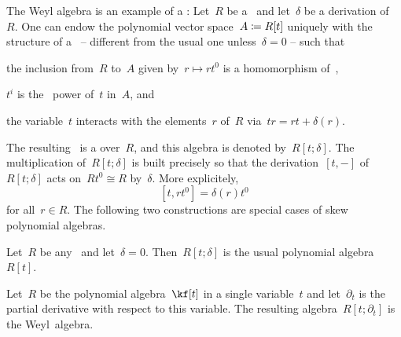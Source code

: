\begin{remark}
	The Weyl algebra is an example of a :
	Let~$R$ be a~\algebra{$\kf$} and let~$\delta$ be a derivation of~$R$.
	One can endow the polynomial vector space~$A \coloneqq R[t]$ uniquely with the structure of a~\algebra{$\kf$} -- different from the usual one unless~$\delta = 0$ -- such that
	\begin{itemize*}
		\item
			the inclusion from~$R$ to~$A$ given by~$r \mapsto r t^0$ is a homomorphism of~\algebras{$\kf$},
		\item
			$t^i$ is the~ power of~$t$ in~$A$, and
		\item
			the variable~$t$ interacts with the elements~$r$ of~$R$ via~$tr = rt + \delta(r)$.
	\end{itemize*}
	The resulting~\algebra{$\kf$} is a  over~$R$, and this algebra is denoted by~$R[t;\delta]$.
	The multiplication of~$R[t;\delta]$ is built precisely so that the derivation~$[t,-]$ of~$R[t;\delta]$ acts on~$R t^0 \cong R$ by~$\delta$.
	More explicitely,
	\[
		[t, r t^0]
		=
		\delta(r) t^0
	\]
	for all~$r \in R$.
	The following two constructions are special cases of skew polynomial algebras.
	\begin{enumerate*}
		\item
			Let~$R$ be any~\algebra{$\kf$} and let~$\delta = 0$.
			Then~$R[t; \delta]$ is the usual polynomial algebra~$R[t]$.
		\item
			Let~$R$ be the polynomial algebra~$\kf[t]$ in a single variable~$t$ and let~$\partial_t$ is the partial derivative with respect to this variable.
			The resulting algebra~$R[t;\partial_t]$ is the Weyl~algebra.
	\end{enumerate*}

%
\end{remark}


